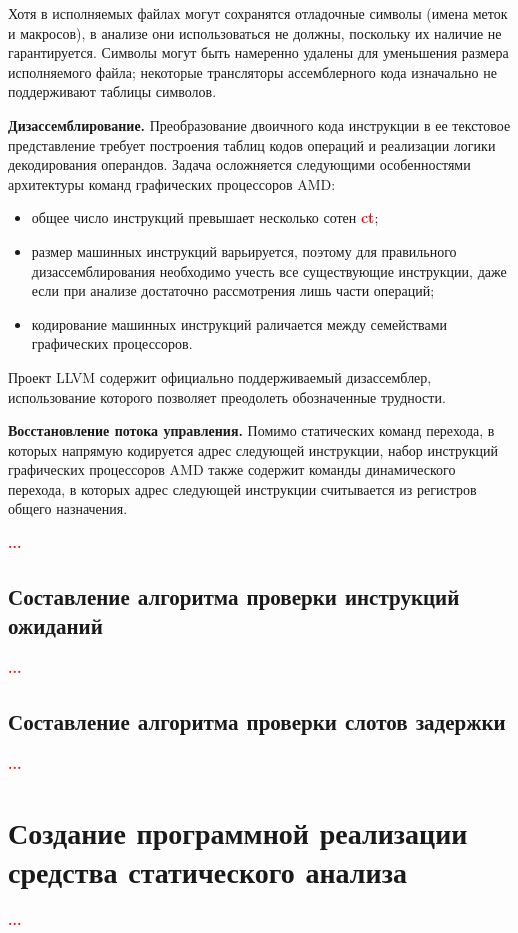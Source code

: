 \documentclass[a4paper,14pt]{extarticle}
\newcommand{\todo}[1]{\textbf{\textcolor{red}{#1}}}
\newcommand{\topic}[1]{\textbf{#1.}}
\newenvironment{ul}{\begin{itemize}[noitemsep,topsep=0em]}{\end{itemize}\vspace{4mm}}
\begin{document}
Хотя в исполняемых файлах могут сохранятся отладочные символы
(имена меток и макросов), в анализе они использоваться не должны, поскольку их наличие не гарантируется.
Символы могут быть намеренно удалены для уменьшения размера исполняемого файла;
некоторые трансляторы ассемблерного кода изначально не поддерживают таблицы символов.

\topic{Дизассемблирование} Преобразование двоичного кода инструкции в ее текстовое представление
требует построения таблиц кодов операций и реализации логики декодирования операндов.
Задача осложняется следующими особенностями архитектуры команд графических процессоров AMD:
\begin{ul}
\item общее число инструкций превышает несколько сотен \todo{ct};
\item размер машинных инструкций варьируется, поэтому для правильного дизассемблирования необходимо
  учесть все существующие инструкции, даже если при анализе достаточно рассмотрения лишь части операций;
\item кодирование машинных инструкций раличается между семействами графических процессоров.
\end{ul}

Проект LLVM содержит официально поддерживаемый дизассемблер, использование которого позволяет
преодолеть обозначенные трудности.

\topic{Восстановление потока управления} Помимо статических команд перехода, в которых напрямую
кодируется адрес следующей инструкции, набор инструкций графических процессоров AMD также содержит
команды динамического перехода, в которых адрес следующей инструкции считывается из регистров
общего назначения.

\todo{...}

\subsection{Составление алгоритма проверки инструкций ожиданий}

\todo{...}

\subsection{Составление алгоритма проверки слотов задержки}

\todo{...}

\section{Создание программной реализации средства статического анализа}

\todo{...}

\newpage
{}
{}
\printbibliography[title={СПИСОК ИСТОЧНИКОВ}]
\end{document}

